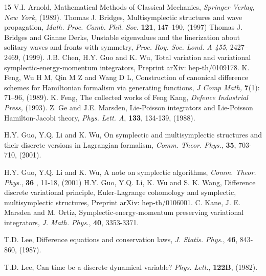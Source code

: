\documentclass[a4paper,a4paper]{article}
\begin{document}


\begin{thebibliography} {15}
\label{a1} V.I. Arnold, Mathematical Methods of Classical Mechanics,
      {\em Springer Verlag, New York,} (1989).
\label{b1}  Thomas J. Bridges, Multisymplectic structures and wave
              propagation,
              {\em Math. Proc. Camb. Phil. Soc.}  {\bf 121}, 147--190, (1997)
\label{b2}  Thomas J. Bridges and Gianne Derks,  Unstable eigenvalues and
             the linerization
     about solitary waves and fronts with symmetry, {\em Proc. Roy. Soc. Lond. A
            455},  2427--2469, (1999).
\label{c1}
    J.B. Chen, H.Y. Guo and K. Wu, Total variation and variational
    symplectic-energy-momentum integrators, Preprint arXiv: hep-th/0109178.
\label{f1} K. Feng, Wu H M, Qin M Z and Wang D L, Construction of canonical difference
             schemes for Hamiltonian formalism via generating functions,
             {\em J Comp Math,}  {\bf 7}(1): 71--96, (1989).
\label{f2}K. Feng, The collected works of Feng Kang, {\em Defence
Industrial Press, } (1993).
\label{g1}
Z. Ge and J.E. Marsden, Lie-Poisson integrators and Lie-Poisson Hamilton-Jacobi
theory, {\em Phys. Lett. A}, {\bf 133}, 134-139, (1988).

\label{glw}
H.Y. Guo, Y.Q. Li and K. Wu, On symplectic and multisymplectic
structures and their discrete versions in Lagrangian formalism,
{\em Comm. Theor. Phys.}, {\bf 35}, 703-710, (2001).

\label{guo1}
H.Y. Guo, Y.Q. Li and K. Wu, A note on symplectic algorithms, {\em Comm. Theor. Phys.},
{\bf 36 }, 11-18, (2001)
\label{guo2}
H.Y. Guo, Y.Q. Li, K. Wu and S. K. Wang, Difference discrete variational principle,
Euler-Lagrange cohomology and symplectic, multisymplectic structures, Preprint
arXiv: hep-th/0106001.
\label{k1}
C. Kane, J. E. Marsden and M. Ortiz,  Symplectic-energy-momentum preserving
variational integrators, {\em J. Math. Phys.}, {\bf 40}, 3353-3371.

\label{l1}
T.D. Lee, Difference equations and conservation laws, {\em J. Statis. Phys.},
{\bf 46}, 843-860, (1987).

\label{l2}
T.D. Lee, Can time be a discrete dynamical variable? {\em Phys. Lett.}, {\bf
122B}, (1982).


\end{thebibliography}
\end{document}
